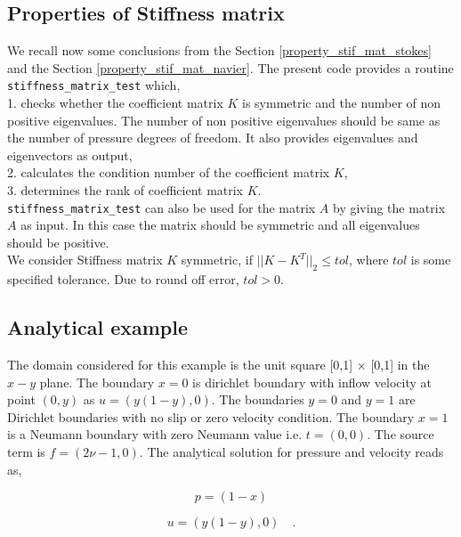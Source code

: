 \documentclass[a4paper]{book}
\begin{document}
\subsection{Properties of Stiffness matrix}

We recall now some conclusions from the Section \ref{property_stif_mat_stokes} and the Section \ref{property_stif_mat_navier}. The present code provides a routine \verb|stiffness_matrix_test| which, \\

1. checks whether the coefficient matrix $K$ is symmetric and the number of non positive eigenvalues. The number of non positive eigenvalues should be same as the number of pressure degrees of freedom. It also provides eigenvalues and eigenvectors as output,\\

2. calculates the condition number of the coefficient matrix $K$, \\

3. determines the rank of coefficient matrix $K$.\\

\verb|stiffness_matrix_test| can also be used for the matrix $A$ by giving the matrix $A$ as input. In this case the matrix should be symmetric and all eigenvalues should be positive.\\

We consider Stiffness matrix $K$ symmetric, if $||K-K^T||_2 \leq tol$, where $tol$ is some specified tolerance. Due to round off error, $tol > 0$.   

\subsection{Analytical example}

The domain considered for this example is the unit square [0,1] $\times$ [0,1] in the $x-y$ plane. 
The boundary ${x=0}$ is dirichlet boundary with inflow velocity at point $(0,y)$ as $u = (y(1-y), 0)$. The boundaries ${y = 0}$ and ${y = 1}$ are Dirichlet boundaries with no slip or zero velocity condition. The boundary ${x = 1}$ is a Neumann boundary with zero Neumann value i.e. $t = (0, 0)$. The source term is $f = (2 \nu - 1, 0)$. The analytical solution for pressure and velocity reads as,

\begin{center}

\begin{equation}
p = (1 - x)
\end{equation}

\begin{equation} 
 u = (y(1-y), 0) \quad \textrm{.}
\end{equation}

\end{center}
\end{document}
